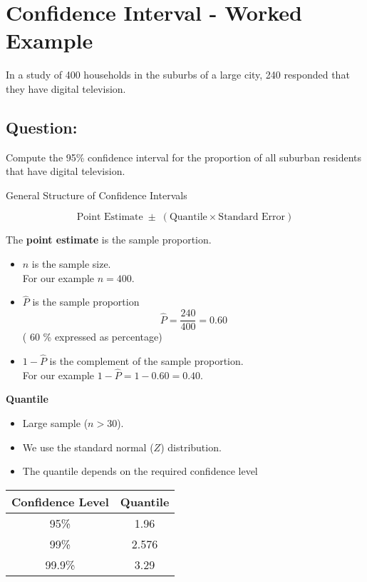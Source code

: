 \documentclass[a4paper,12pt]{article}
\begin{document}
\section*{Confidence Interval - Worked Example}

In a study of 400 households in the suburbs of a large city, 240 responded
that they have digital television.
\\
\bigskip
\subsection*{Question:} Compute the 95\% confidence interval for the proportion of all suburban residents that have digital television.


\begin{framed}
General Structure of Confidence Intervals

\[
\mbox{Point Estimate} \; \pm \; \left( \mbox{Quantile} \times \mbox{Standard Error} \right)
\]
\end{framed}



The \textbf{point estimate} is the sample proportion.
\begin{itemize}
	\item $n$ is the sample size. \\
	For our example $n = 400$.
	\vspace{0.1cm}
	\item $\hat{P}$ is the sample proportion
	\[ \hat{P} = \frac{240}{400} = 0.60 \]
	( 60 \% expressed as percentage)
	\vspace{0.1cm}
	\item $1 - \hat{P}$ is the complement of the sample proportion.\\ For our example $1- \hat{P} = 1 - 0.60  =  0.40.$
	
\end{itemize}


\textbf{Quantile}
\begin{itemize}
	\item Large sample ($n >30$).
	\item We use the standard normal ($Z$) distribution.
	\item The quantile depends on the required confidence level
\end{itemize}
\begin{center}
	\begin{tabular}{|c|c|}
		\hline \phantom{sp} Confidence Level \phantom{sp}  &  \phantom{sp} Quantile \phantom{sp} \\ 
		\hline  95\% & 1.96  \\ 
		\hline  99\% & 2.576 \\ 
		\hline  99.9\%& 3.29  \\ 
		\hline 
	\end{tabular} 
\end{center}
\end{document}
